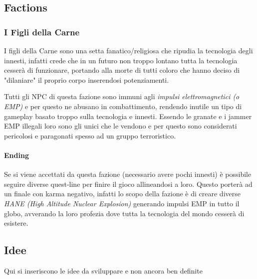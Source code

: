 \documentclass[11pt, oneside]{article}
\begin{document}
\subsection{Factions}
\subsubsection{I Figli della Carne}
I figli della Carne sono una setta fanatico/religiosa che ripudia la tecnologia degli innesti, infatti crede che in un futuro non troppo lontano tutta la tecnologia cesserà di funzionare, portando alla morte di tutti coloro che hanno deciso di "dilaniare" il proprio corpo inserendosi potenziamenti.

Tutti gli NPC di questa fazione sono immuni agli \textit{impulsi elettromagnetici (o EMP)} e per questo ne abusano in combattimento, rendendo inutile un tipo di gameplay basato troppo sulla tecnologia e innesti.
Essendo le granate e i jammer EMP illegali loro sono gli unici che le vendono e per questo sono considerati pericolosi e paragonati spesso ad un gruppo terroristico.

\paragraph{Ending}
Se si viene accettati da questa fazione (necessario avere pochi innesti) è possibile seguire diverse quest-line per finire il gioco allineandosi a loro. Questo porterà ad un finale con karma negativo, infatti lo scopo della fazione è di creare diverse \textit{HANE (High Altitude Nuclear Explosion)} generando impulsi EMP in tutto il globo, avverando la loro profezia dove tutta la tecnologia del mondo cesserà di esistere.

\subsection{Idee}
Qui si inseriscono le idee da sviluppare e non ancora ben definite
\end{document}
